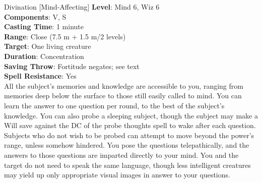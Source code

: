 {Divination [Mind-Affecting]}
{
	\textbf{Level}: Mind 6, Wiz 6\\
	\textbf{Components}: V, S\\
	\textbf{Casting Time}: 1 minute\\
	\textbf{Range}: Close (7.5 m + 1.5 m/2 levels)\\
	\textbf{Target}: One living creature\\
	\textbf{Duration}: Concentration\\
	\textbf{Saving Throw}: Fortitude negates; see text\\
	\textbf{Spell Resistance}: Yes\\
}
{
	All the subject's memories and knowledge are accessible to you, ranging from memories deep below the surface to those still easily called to mind. You can learn the answer to one question per round, to the best of the subject's knowledge. You can also probe a sleeping subject, though the subject may make a Will save against the DC of the probe thoughts spell to wake after each question. Subjects who do not wish to be probed can attempt to move beyond the power's range, unless somehow hindered. You pose the questions telepathically, and the answers to those questions are imparted directly to your mind. You and the target do not need to speak the same language, though less intelligent creatures may yield up only appropriate visual images in answer to your questions.
}
